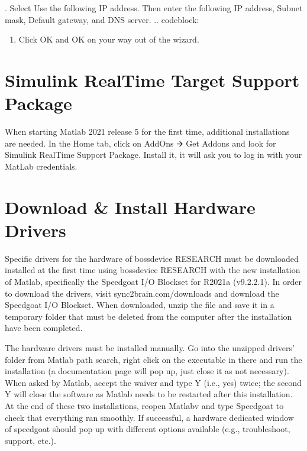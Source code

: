 \documentclass[letterpaper,10pt,english]{sphinxmanual}
\begin{document}
. Select Use the following IP address. Then enter the following IP address, Subnet mask, Default gateway, and DNS server.
.. code\sphinxhyphen{}block:

\begin{sphinxVerbatim}[commandchars=\\\{\}]
           
          
 
 
\end{sphinxVerbatim}
\begin{enumerate}
%
\setcounter{enumi}{5}
\item {} 
\sphinxAtStartPar
Click OK and OK on your way out of the wizard.

\end{enumerate}


\section{Simulink Real\sphinxhyphen{}Time Target Support Package}
\label{\detokenize{2_setup_bossdevice_research:simulink-real-time-target-support-package}}
\sphinxAtStartPar
When starting Matlab 2021 release 5 for the first time, additional installations are needed.
In the Home tab, click on Add\sphinxhyphen{}Ons 🡪 Get Add\sphinxhyphen{}ons and look for Simulink Real\sphinxhyphen{}Time Support Package. Install it, it will ask you to log in with your MatLab credentials.


\section{Download \& Install Hardware Drivers}
\label{\detokenize{2_setup_bossdevice_research:download-install-hardware-drivers}}
\sphinxAtStartPar
Specific drivers for the hardware of bossdevice RESEARCH  must be downloaded installed at the first time using bossdevice RESEARCH with the new installation of Matlab, specifically the Speedgoat I/O Blockset for R2021a (v9.2.2.1). In order to download the drivers, visit sync2brain.com/downloads and download the Speedgoat I/O Blockset. When downloaded, unzip the file and save it in a temporary folder that must be deleted from the computer after the installation have been completed.

\sphinxAtStartPar
The hardware drivers must be installed manually. Go into the unzipped drivers’ folder from Matlab path search, right click on the executable in there and run the installation (a documentation page will pop up, just close it as not necessary). When asked by Matlab, accept the waiver and type Y (i.e., yes) twice; the second Y will close the software as Matlab needs to be restarted after this installation.
At the end of these two installations, reopen Matlabv and type Speedgoat to check that everything ran smoothly. If successful, a hardware dedicated window of speedgoat should pop up with different options available (e.g., troubleshoot, support, etc.).
\end{document}
